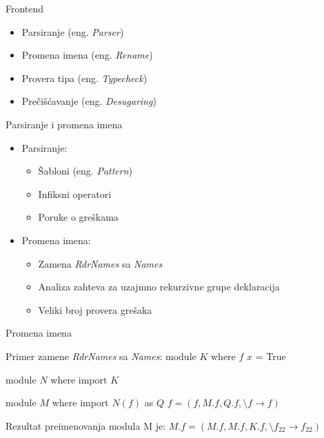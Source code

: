 \documentclass{beamer}
\begin{document}
\begin{frame}{Frontend}
	\begin{itemize}
		\item Parsiranje (eng. \emph{Parser})
		\item Promena imena (eng. \emph{Rename}) 
		\item Provera tipa (eng. \emph{Typecheck})
		\item Prečišćavanje (eng. \emph{Desugaring})
	\end{itemize} 
\end{frame}

\begin{frame}{Parsiranje i promena imena}
	\begin{itemize}
		\item Parsiranje:
		\begin{itemize}
			\item Šabloni (eng. \emph{Pattern})
			\item Infiksni operatori
			\item Poruke o greškama
		\end{itemize}	
	\end{itemize}
	
	\begin{itemize}
		\item Promena imena:
		\begin{itemize}
			\item Zamena \textit{RdrNames} sa \textit{Names}
			\item Analiza zahteva za uzajmno rekurzivne grupe deklaracija
			\item Veliki broj provera grešaka
		\end{itemize}	
	\end{itemize}
	

\end{frame}

\begin{frame}[fragile]{Promena imena}
	
		\begin{block}{Primer zamene \textit{RdrNames} sa \textit{Names}:}
			module $ K $ where
			$ f $ $ x $ = True
			
			module $ N $ where
			import $ K $
			
			module $ M $ where
			import $ N( f ) $ as $ Q $ 
			$f = (f, M.f, Q.f,  \setminus f  \rightarrow f) $
		\end{block}
	
		\begin{block}{Rezultat preimenovanja modula M je:}
		$ 	M.f = (M.f, M.f, K.f, \setminus f_{22} \rightarrow f_{22}) $
		\end{block}

\end{frame}
\end{document}
